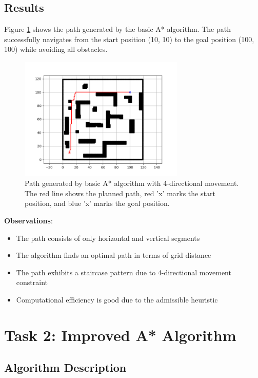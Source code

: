 \documentclass[aps,letterpaper,10pt]{revtex4}
\begin{document}
\subsection{Results}

Figure \ref{fig:task1} shows the path generated by the basic A* algorithm. The path successfully navigates from the start position (10, 10) to the goal position (100, 100) while avoiding all obstacles.

\begin{figure}[H]
  \centering
  \includegraphics[width=0.7\textwidth]{assets/task-1.png}
  \caption{Path generated by basic A* algorithm with 4-directional movement. The red line shows the planned path, red 'x' marks the start position, and blue 'x' marks the goal position.}
  \label{fig:task1}
\end{figure}

\textbf{Observations}:
\begin{itemize}
    \item The path consists of only horizontal and vertical segments
    \item The algorithm finds an optimal path in terms of grid distance
    \item The path exhibits a staircase pattern due to 4-directional movement constraint
    \item Computational efficiency is good due to the admissible heuristic
\end{itemize}

\newpage
\section{Task 2: Improved A* Algorithm}

\subsection{Algorithm Description}
\end{document}
